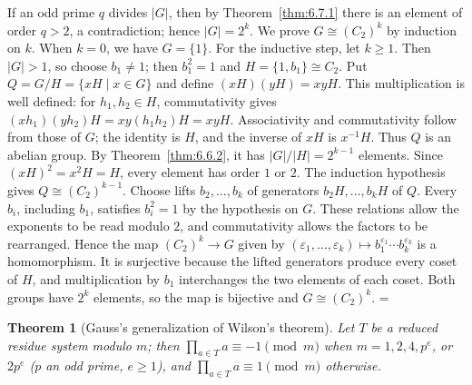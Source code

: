 \documentclass[11pt]{article}
\makeatletter
\let\nt@closedisplay\]
\def\nt@guardedclose{\@ifnextchar\par{\nt@closeafterpar}{\@ifnextchar\end{\postdisplaypenalty\@M\nt@closedisplay}{\nt@closedisplay}}}
\def\nt@closeafterpar\par{\@ifnextchar\par{\nt@closeafterpar}{\@ifnextchar\end{\postdisplaypenalty\@M\nt@closedisplay\par}{\nt@closedisplay\par}}}
\renewenvironment{proof}[1][\proofname]{\par
  \pushQED{\qed}\normalfont\topsep\medskipamount\edef\nt@afterproof{\@endparpenalty=\the\@endparpenalty\relax}\@beginparpenalty\@M\@endparpenalty\@M\let\]\nt@guardedclose\trivlist\item[]\textit{#1\@addpunct{.}} \ignorespaces}{\ifvmode\addpenalty\@M\fi\popQED\nt@afterproof\endtrivlist\@endpefalse}
\theoremstyle{ntstyle}
\newtheorem{theorem}{Theorem}[subsection]
\makeatother
\begin{document}
\begin{proof} If an odd prime $q$ divides $|G|$, then by
  Theorem~\ref{thm:6.7.1} there is an element of order $q > 2$, a contradiction;
  hence $|G| = 2^{k}$. We prove $G \cong (C_2)^{k}$ by induction on
  $k$. When $k = 0$, we have $G = \{1\}$. For the inductive step, let
  $k\ge1$. Then $|G|>1$, so choose $b_1\neq 1$; then $b_1^2=1$ and $H = \{1, b_1\} \cong C_2$. Put
  $Q=G/H=\{xH\mid x\in G\}$ and define $(xH)(yH)=xyH$.
  This multiplication is well defined: for $h_1,h_2\in H$, commutativity gives
  $(xh_1)(yh_2)H=xy(h_1h_2)H=xyH$.
  Associativity and commutativity follow from those of $G$; the identity is
  $H$, and the inverse of $xH$ is $x^{-1}H$. Thus $Q$ is an abelian group.
  By Theorem~\ref{thm:6.6.2}, it has $|G|/|H|=2^{k-1}$ elements.
  Since $(xH)^2=x^2H=H$, every element has order $1$ or $2$.
  The induction hypothesis gives $Q\cong(C_2)^{k-1}$.
  Choose lifts $b_2,\ldots,b_k$ of generators $b_2H,\ldots,b_kH$ of $Q$.
  Every $b_i$, including $b_1$, satisfies $b_i^2=1$ by the hypothesis on $G$.
  These relations allow the exponents to be read modulo $2$, and commutativity
  allows the factors to be rearranged. Hence the map $(C_2)^k\to G$ given by
  $(\varepsilon_1,\ldots,\varepsilon_k)\mapsto b_1^{\varepsilon_1}\cdots b_k^{\varepsilon_k}$
  is a homomorphism. It is surjective because the lifted generators produce
  every coset of $H$, and multiplication by $b_1$ interchanges the two elements
  of each coset. Both groups have $2^k$ elements, so the map is bijective and
  $G\cong(C_2)^k$.
\end{proof}

\begin{theorem}[Gauss's generalization of Wilson's theorem]\label{thm:6.7.3}\label{thm:gauss-generalization-of-wilson-theorem}
  Let $T$ be a reduced residue system modulo $m$; then
  $\prod_{a \in T} a \equiv -1 \pmod{m}$ when $m = 1, 2, 4, p^{e}$, or $2 p^{e}$ ($p$ an odd prime, $e \ge 1$), and
  $\prod_{a \in T} a \equiv 1 \pmod{m}$ otherwise.

\end{theorem}
\end{document}
